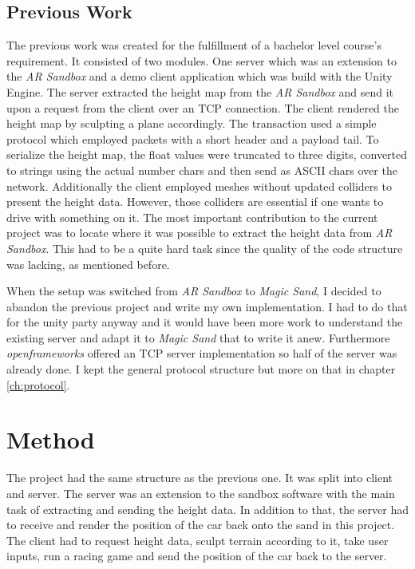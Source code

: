\documentclass[12pt,a4paper,twoside,titlepage,headsepline,numbers=noenddot,listof=totoc,index=totoc,bibliography=totoc]{scrartcl}
\theoremstyle{break}
\begin{document}
\subsection{Previous Work}
The previous work was created for the fulfillment of a bachelor level course's requirement. It consisted of two modules. One server which was an extension to the \textit{AR Sandbox} and a demo client application which was build with the Unity Engine. The server extracted the height map from the \textit{AR Sandbox} and send it upon a request from the client over an TCP connection. The client rendered the height map by sculpting a plane accordingly. The transaction used a simple protocol which employed packets with a short header and a payload tail. To serialize the height map, the float values were truncated to three digits, converted to strings using the actual number chars and then send as ASCII chars over the network.  Additionally the client employed meshes without updated colliders to present the height data. However, those colliders are essential if one wants to drive with something on it. The most important contribution to the current  project was to locate where it was possible to extract the height data from \textit{AR Sandbox}. This had to be a quite hard task since the quality of the code structure was lacking, as mentioned before. 

When the setup was switched from \textit{AR Sandbox} to \textit{Magic Sand}, I decided to abandon the previous project and write my own implementation. I had to do that for the unity party anyway and it would have been more work to understand the existing server and adapt it to \textit{Magic Sand} that to write it anew. Furthermore \textit{openframeworks} offered an TCP server implementation so half of the server was already done. I kept the general protocol structure but more on that in chapter \ref{ch:protocol}.


\section{Method}
The project had the same structure as the previous one. It was split into client and server. The server was an extension to the sandbox software with the main task of extracting and sending the height data. In addition to that, the server had to receive and render the position of the car back onto the sand in this project. The client had to request height data, sculpt terrain according to it, take user inputs, run a racing game and send the position of the car back to the server.
\end{document}
